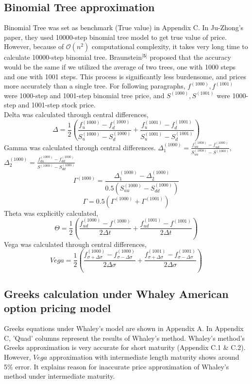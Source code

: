\documentclass[preprint,12pt,1p]{elsarticle}
\begin{document}
\begin{spacing}{1.5}
\subsection{Binomial Tree approximation}
\label{subsec1}
Binomial Tree was set as benchmark (True value) in Appendix C. In Ju-Zhong's paper, they used 10000-step binomial tree model to get true value of price. However, because of $\mathcal{O}(n^2)$ computational complexity, it takes very long time to calculate 10000-step binomial tree. Braunstein$^{\textbf{[5]}}$ proposed that the accuracy would be the same if we utilized the average of two trees, one with 1000 steps and one with 1001 steps. This process is significantly less burdensome, and prices more accurately than a single tree. For following paragraphs, $f^{(1000)}, f^{(1001)}$ were 1000-step and 1001-step binomial tree price, and $S^{(1000)}, S^{(1001)}$ were 1000-step and 1001-step stock price.\\
Delta was calculated through central differences, $$\Delta = \frac{1}{2}(\frac{f^{(1000)}_{u}-f^{(1000)}_{d}}{S^{(1000)}_u - S^{(1000)}_d} + \frac{f^{(1001)}_{u}-f^{(1001)}_{d}}{S^{(1001)}_u - S^{(1001)}_d})$$
Gamma was calculated through central differences. $\Delta^{(1000)}_1 = \frac{f^{(1000)}_{uu}-f^{(1000)}_{ud}}{S^{(1000)}_{uu} - S^{(1000)}}$, $\Delta^{(1000)}_2 = \frac{f^{(1000)}_{du}-f^{(1000)}_{dd}}{S^{(1000)} - S^{(1000)}_{dd}}$
$$\Gamma^{(1000)} = \frac{\Delta^{(1000)}_1 - \Delta^{(1000)}_2 }{0.5(S^{(1000)}_{uu} - S^{(1000)}_{dd})}$$
$$\Gamma = 0.5 (\Gamma^{(1000)} + \Gamma^{(1001)} )$$
Theta was explicitly calculated, $$\Theta = \frac{1}{2}(\frac{f^{(1000)}_{ud} - f^{(1000)}}{2\Delta t} + \frac{f^{(1001)}_{ud} - f^{(1001)}}{2\Delta t})$$
Vega was calculated through central differences, $$Vega = \frac{1}{2}(\frac{f^{(1000)}_{\sigma+\Delta \sigma} - f^{(1000)}_{\sigma - \Delta \sigma}}{2\Delta \sigma}+ \frac{f^{(1001)}_{\sigma+\Delta \sigma} - f^{(1001)}_{\sigma - \Delta \sigma}}{2\Delta \sigma})$$



\subsection{Greeks calculation under Whaley American option pricing model}
\label{subsec2}
Greeks equations under Whaley's model are shown in Appendix A. In Appendix C, 'Quad' columns represent the results of Whaley's method. Whaley's method's Greeks approximation is very accurate for short maturity (Appendix C.1 \& C.2). However, $Vega$ approximation with intermediate length maturity shows around 5\% error. It explains reason for inaccurate price approximation of Whaley's method under intermediate maturity.


\end{spacing}
\end{document}
